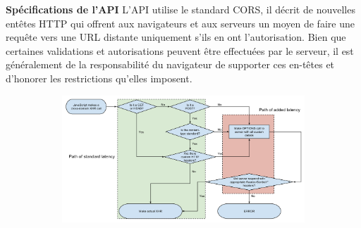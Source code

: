 \documentclass{article}
\begin{document}
\textbf{Spécifications de l'API}
\newline
\newline
L'API utilise le standard CORS, il décrit de nouvelles entêtes HTTP qui offrent aux navigateurs et aux serveurs un moyen de faire une requête vers une URL distante uniquement s'ils en ont l'autorisation. Bien que certaines validations et autorisations peuvent être effectuées par le serveur, il est généralement de la responsabilité du navigateur de supporter ces en-têtes et d'honorer les restrictions qu'elles imposent.
\newline
\begin{figure}[h!]
	\centering
  	\begin{subfigure}[b]{1.0\linewidth}
    \includegraphics[width=\linewidth]{cors.png}
  	\end{subfigure}
\end{figure}
\newpage
\end{document}

